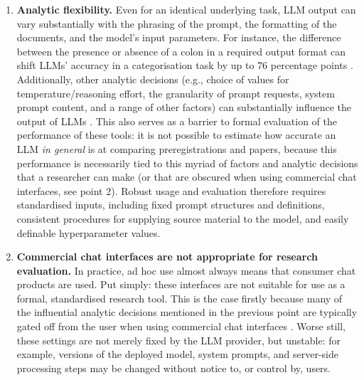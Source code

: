 \documentclass{article}
\begin{document}
\begin{enumerate}
  \item \textbf{Analytic flexibility.} Even for an identical underlying task,
  LLM output can vary substantially with the phrasing of the prompt, the
  formatting of the documents, and the model's input parameters. For instance,
  the difference between the presence or absence of a colon in a required output
  format can shift LLMs' accuracy in a categorisation task by up to 76
  percentage points \citep{sclar_quantifying_2023}. Additionally, other analytic
  decisions (e.g., choice of values for temperature/reasoning effort, the
  granularity of prompt requests, system prompt content, and a range of other
  factors) can substantially influence the output of LLMs
  \citep{cummins_threat_2025}. This also serves as a barrier to formal
  evaluation of the performance of these tools: it is not possible to estimate
  how accurate an LLM \emph{in general} is at comparing preregistrations and
  papers, because this performance is necessarily tied to this myriad of factors
  and analytic decisions that a researcher can make (or that are obscured when
  using commercial chat interfaces, see point 2). Robust usage and evaluation
  therefore requires standardised inputs, including fixed prompt structures and
  definitions, consistent procedures for supplying source material to the model,
  and easily definable hyperparameter values.

  \item \textbf{Commercial chat interfaces are not appropriate for research
  evaluation.} In practice, ad hoc use almost always means that consumer chat
  products are used. Put simply: these interfaces are not suitable for use as a
  formal, standardised research tool. This is the case firstly because many of
  the influential analytic decisions mentioned in the previous point are
  typically gated off from the user when using commercial chat interfaces
  \citep{higgins_recommendations_2026}. Worse still, these settings are not
  merely fixed by the LLM provider, but unstable: for example, versions of the
  deployed model, system prompts, and server-side processing steps may be
  changed without notice to, or control by, users.


\end{enumerate}
\end{document}
